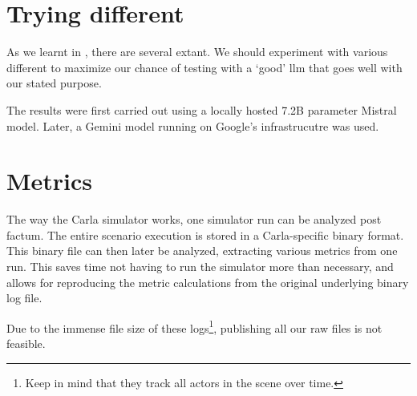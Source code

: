 \section{Trying different }

As we learnt in , there are several  extant. We should
experiment with various different  to maximize our chance of testing with a `good'
\acrshort{llm} that goes well with our stated purpose.

The results were first carried out using a locally hosted \num{7.2}B parameter
Mistral model. Later, a Gemini model running on Google's infrastrucutre was used.

\section{Metrics}

The way the Carla simulator works, one simulator run can be analyzed post factum. The entire
scenario execution is stored in a Carla-specific binary format. This binary file can then later be
analyzed, extracting various metrics from one run. This saves time not having to run the simulator
more than necessary, and allows for reproducing the metric calculations from the original underlying
binary log file.

Due to the immense file size of these logs\footnote{Keep in mind that they track all actors in the
    scene over time.}, publishing all our raw files is not feasible.
